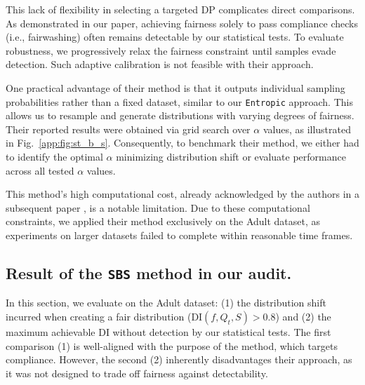 \documentclass[runningheads, orivec]{llncs}
\begin{document}
This lack of flexibility in selecting a targeted DP complicates direct comparisons. As demonstrated in our paper, achieving fairness solely to pass compliance checks (i.e., fairwashing) often remains detectable by our statistical tests. To evaluate robustness, we progressively relax the fairness constraint until samples evade detection. Such adaptive calibration is not feasible with their approach.

One practical advantage of their method is that it outputs individual sampling probabilities rather than a fixed dataset, similar to our \texttt{Entropic} approach. This allows us to resample and generate distributions with varying degrees of fairness. Their reported results were obtained via grid search over $\alpha$ values, as illustrated in Fig.~\ref{app:fig:st_b_s}. Consequently, to benchmark their method, we either had to identify the optimal $\alpha$ minimizing distribution shift or evaluate performance across all tested $\alpha$ values.

This method’s high computational cost, already acknowledged by the authors in a subsequent paper \cite{yamamoto2024fast}, is a notable limitation. Due to these computational constraints, we applied their method exclusively on the Adult dataset, as experiments on larger datasets failed to complete within reasonable time frames.

\subsection{Result of the \texttt{SBS} method in our audit.} 

In this section, we evaluate on the Adult dataset: (1) the distribution shift incurred when creating a fair distribution ($\text{DI}(f, Q_t, S) > 0.8$) and (2) the maximum achievable DI without detection by our statistical tests. The first comparison (1) is well-aligned with the purpose of the method, which targets compliance. However, the second (2) inherently disadvantages their approach, as it was not designed to trade off fairness against detectability.
\end{document}
